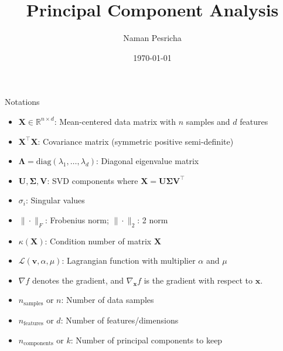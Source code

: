 \documentclass{beamer}
\title{Principal Component Analysis}
\author{Naman Pesricha}
\date{\today}
\begin{document}
\begin{frame}
    \titlepage
\end{frame}

\begin{frame}{Notations}
    \begin{itemize}
        \item $\mathbf{X} \in \mathbb{R}^{n \times d}$: Mean-centered data matrix with $n$ samples and $d$ features
        \item $ \mathbf{X}^\top\mathbf{X}$: Covariance matrix (symmetric positive semi-definite)
        \item $\mathbf{\Lambda} = \text{diag}(\lambda_1, \ldots, \lambda_d)$: Diagonal eigenvalue matrix
        \item $\mathbf{U}, \mathbf{\Sigma}, \mathbf{V}$: SVD components where $\mathbf{X} = \mathbf{U}\mathbf{\Sigma}\mathbf{V}^\top$
        \item $\sigma_i$: Singular values 
        \item $\|\cdot\|_F$: Frobenius norm; $\|\cdot\|_2$: 2 norm
        \item $\kappa(\mathbf{X})$: Condition number of matrix $\mathbf{X}$
        \item $\mathcal{L}(\mathbf{v}, \alpha, \mu)$: Lagrangian function with multiplier $\alpha$ and $\mu$
        \item $\nabla f$ denotes the gradient, and $\nabla_{\mathbf{x}} f$ is the gradient with respect to $\mathbf{x}$.
        \item $n_{\text{samples}}$ or $n$: Number of data samples
        \item $n_{\text{features}}$ or $d$: Number of features/dimensions
        \item $n_{\text{components}}$ or $k$: Number of principal components to keep
    \end{itemize}
\end{frame}
\end{document}
